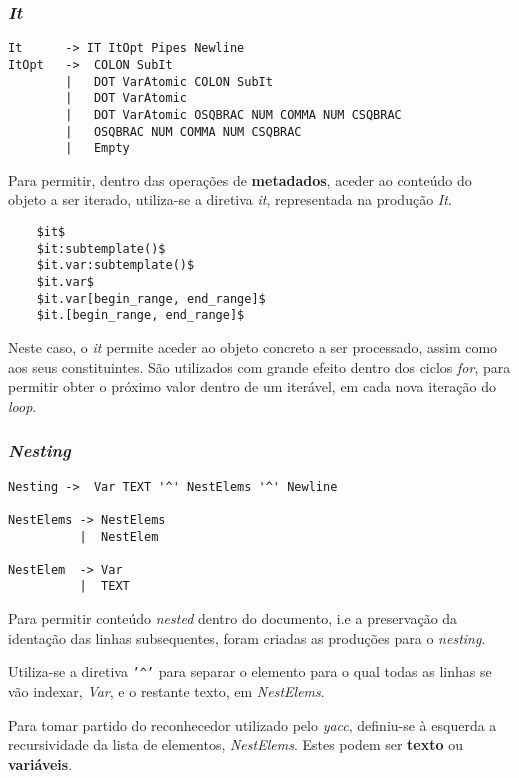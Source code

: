 \documentclass[../relatorio.tex]{subfiles}
\begin{document}
\subsubsection{\textit{It}} \label{grm:it}
\begin{verbatim}
It      -> IT ItOpt Pipes Newline
ItOpt   ->  COLON SubIt                                
        |   DOT VarAtomic COLON SubIt                        
        |   DOT VarAtomic                                    
        |   DOT VarAtomic OSQBRAC NUM COMMA NUM CSQBRAC      
        |   OSQBRAC NUM COMMA NUM CSQBRAC              
        |   Empty  
\end{verbatim}
Para permitir, dentro das operações de \textbf{metadados}, aceder ao conteúdo do objeto
a ser iterado, utiliza-se a diretiva \textit{it},
representada na produção \textit{It}.

\begin{verbatim}
    $it$
    $it:subtemplate()$
    $it.var:subtemplate()$
    $it.var$
    $it.var[begin_range, end_range]$
    $it.[begin_range, end_range]$
\end{verbatim}

Neste caso, o \textit{it} permite aceder ao objeto concreto a ser processado,
assim como aos seus constituintes.
São utilizados com grande efeito dentro dos ciclos \textit{for}, 
para permitir obter o próximo valor dentro de um 
iterável, em cada nova iteração do \textit{loop}.


\subsubsection{\textit{Nesting}} \label{grm:nest}
\begin{verbatim}
Nesting ->  Var TEXT '^' NestElems '^' Newline

NestElems -> NestElems
          |  NestElem

NestElem  -> Var
          |  TEXT
\end{verbatim}
Para permitir conteúdo \textit{nested} dentro do documento, i.e
a preservação da identação das linhas subsequentes, 
foram criadas as produções para o \textit{nesting}.

Utiliza-se a diretiva \texttt{'^'} para separar o elemento para o qual todas as 
linhas se vão indexar, \textit{Var}, e o restante texto, em \textit{NestElems}.

Para tomar partido do reconhecedor utilizado pelo \textit{yacc}, 
definiu-se à esquerda a recursividade da lista de elementos, \textit{NestElems}.
Estes podem ser \textbf{texto} ou \textbf{variáveis}.
\end{document}
